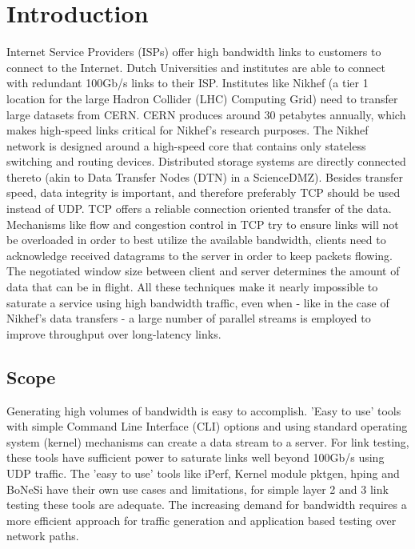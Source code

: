 \chapter{Introduction}\label{ch:intro}
Internet Service Providers (ISPs) offer high bandwidth links to customers to connect to the Internet. Dutch Universities and institutes are able to connect with redundant 100Gb/s links to their ISP.
Institutes like Nikhef (a tier 1 location for the large Hadron Collider (LHC) Computing Grid) need to transfer large datasets from CERN. CERN produces around 30 petabytes annually\cite{cerndata}, which makes high-speed links critical for Nikhef's research purposes.
The Nikhef network is designed around a high-speed core that contains only stateless switching and routing devices. Distributed storage systems are directly connected thereto (akin to Data Transfer Nodes (DTN) in a ScienceDMZ\cite{sciencedmz}).
Besides transfer speed, data integrity is important, and therefore preferably TCP should be used instead of UDP. TCP offers a reliable connection oriented transfer of the data. 
Mechanisms like flow and congestion control in TCP try to ensure links will not be overloaded in order to best utilize the available bandwidth, clients need to acknowledge received datagrams to the server in order to keep packets flowing. 
The negotiated window size between client and server determines the amount of data that can be in flight.  
All these techniques make it nearly impossible to saturate a service using high bandwidth traffic, even when - like in the case of Nikhef's data transfers - a large number of parallel streams is employed to improve throughput over long-latency links.

\section{Scope}\label{sec:scope}

Generating high volumes of bandwidth is easy to accomplish. 'Easy to use' tools with simple Command Line Interface (CLI) options and using standard operating system (kernel) mechanisms can create a data stream to a server. For link testing, these tools have sufficient power to saturate links well beyond 100Gb/s using UDP traffic. 
The 'easy to use' tools like iPerf\cite{iperf}, Kernel module pktgen\cite{pktgen-kernel}, hping\cite{hping} and BoNeSi\cite{bonesi} have their own use cases and limitations, for simple layer 2 and 3 link testing these tools are adequate.
The increasing demand for bandwidth requires a more efficient approach for traffic generation and application based testing over network paths.

